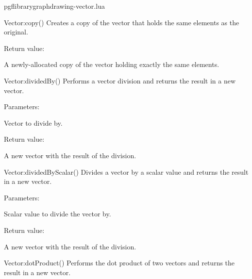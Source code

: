 
\begin{filedescription}{pgflibrarygraphdrawing-vector.lua}


\begin{luacommand}{{Vector:copy}()}
Creates a copy of the vector that holds the same elements as the original. 


Return value:
\begin{parameterdescription} 
  \item[] A newly-allocated copy of the vector holding exactly the same elements. 
\end{parameterdescription}


\end{luacommand}
\begin{luacommand}{{Vector:dividedBy}()}
Performs a vector division and returns the result in a new vector. 

Parameters:
\begin{parameterdescription}
	\item[\meta{other}] Vector to divide by. 
\end{parameterdescription}


Return value:
\begin{parameterdescription} 
  \item[] A new vector with the result of the division. 
\end{parameterdescription}


\end{luacommand}
\begin{luacommand}{{Vector:dividedByScalar}()}
Divides a vector by a scalar value and returns the result in a new vector. 

Parameters:
\begin{parameterdescription}
	\item[\meta{scalar}] Scalar value to divide the vector by. 
\end{parameterdescription}


Return value:
\begin{parameterdescription} 
  \item[] A new vector with the result of the division. 
\end{parameterdescription}


\end{luacommand}
\begin{luacommand}{{Vector:dotProduct}()}
Performs the dot product of two vectors and returns the result in a new vector. 


\end{luacommand}
\end{filedescription}
